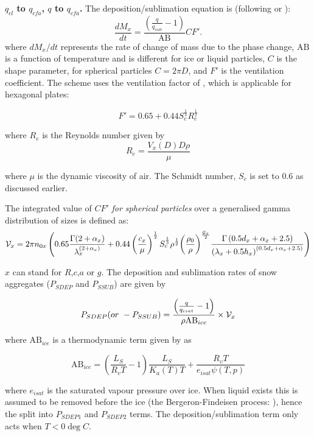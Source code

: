 \documentclass{UMDP_article}
\def\bq{\begin{equation}}
\def\eq{\end{equation}}
\begin{document}
\textbf{$q_{cl}$ to $q_{cfa}$, $q$ to $q_{cfa}$.} The deposition/sublimation 
equation is
(following \citealp{Rogers:Yau:1989} or \citealp{Rutledge:Hobbs:1983}): 
\bq
      \frac {dM_{x}}{dt}=\frac{ \left(\frac{q}{q_{isat}}-1\right)}
                           {\mbox{AB}} C F'.
\label{eq:mic_dmevap}
\eq
where $dM_x/dt$ represents the rate of change of mass due to the phase change, 
$\mbox{AB}$ is a function of temperature and is different for ice or
liquid particles, $C$ is
the shape parameter, for spherical particles $C=2 \pi D$, and
$F'$ is the ventilation coefficient. The scheme uses the ventilation
factor of \cite{Thorpe:Mason:1966}, which is applicable for hexagonal plates:

\bq
F'=0.65+0.44S_c^{\frac{1}{3}} R_e^\frac{1}{2}
\eq

where $R_e$ is the Reynolds number given by
\bq
 R_e = \frac{V_x(D) D \rho}{\mu}
\eq

where $\mu$ is the dynamic viscosity of air. The Schmidt number, $S_c$ is set to 0.6
as discussed earlier. 

The integrated value of $CF'$ \textit{for spherical particles} over a generalised
gamma distribution of sizes is defined as:
\bq
  {{\cal V}_x}=2\pi n_{0x}
          \left(0.65\frac{\Gamma(2+\alpha_x)}{\lambda_x^{(2+\alpha_x)}}
                       +0.44\left(\frac{c_x}{\mu}\right)^{\frac{1}{2}}
                                                          S_c^{\frac{1}{3}}
 \rho^{\frac{1}{2}} {\left( \frac{\rho_0}{\rho} \right)}^{\frac{\mathcal{G}_x}{2}}
        \frac{\Gamma\left(0.5d_x+\alpha_x+2.5\right)}
 {\left(\lambda_x+0.5h_x\right)^{(0.5d_x+\alpha_x+2.5)}}
          \right)
\label{eq:mic_ventx}
\eq

 $x$ can stand for $R$,$c$,$a$ or $g$.
The deposition and sublimation rates of snow aggregates
($P_{SDEP}$ and $P_{SSUB}$) are given by

\bq
 P_{SDEP} ( or ~ -P_{SSUB})=
     \frac{ \left(\frac{q}{q_{isat}}-1\right)} {\rho \mbox{AB}_{ice}}
\times {{\cal V}_x}
\label{eq:mic_xsub}
\eq

where $\mbox{AB}_{ice}$ is a thermodynamic term
given by \cite{Rogers:Yau:1989} as

\bq
  \mbox{AB}_{ice}=\left(\frac{L_S}{R_vT}-1\right)\frac{L_S}{K_a(T)T}+\frac{R_v
  T}{e_{isat}\psi(T,p)}
\label{eq:mic_ABiceUM}
\eq

where $e_{isat}$ is the saturated vapour pressure over ice. When liquid exists this
is assumed to be removed before the ice (the Bergeron-Findeisen process: 
\citealp{Bergeron:1935}),
hence the split into $P_{SDEP1}$ and $P_{SDEP2}$ terms. The deposition/sublimation 
term only acts when $T<0 \deg C$.
\end{document}
